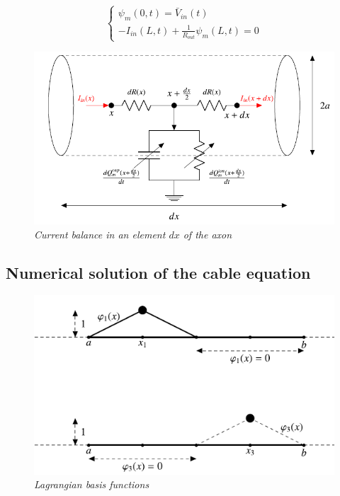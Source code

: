\documentclass[12pt, a4paper]{article}
\begin{document}
\begin{equation}
\begin{cases}
\psi_m(0,t) = \bar{V}_{in}(t) \\
-I_{in}(L,t) +\frac{1}{R_{out}}\psi_m(L,t) =0
\end{cases}
\end{equation}

\begin{figure}[H]
	\begin{center}
		
		\includegraphics[scale=0.5]{curr_bal.png} 
	\end{center} 
	\caption{\textit{Current balance in an element $dx$ of the axon}} \label{curr_bal}
	
\end{figure}

\subsection{Numerical solution of the cable equation}


\begin{figure}[H]
	\begin{center}
		
		\includegraphics[scale=0.7]{basis.png} 
	\end{center} 
	\caption{\textit{Lagrangian basis functions}}
	\label{Lagrangian}
\end{figure}
\end{document}
